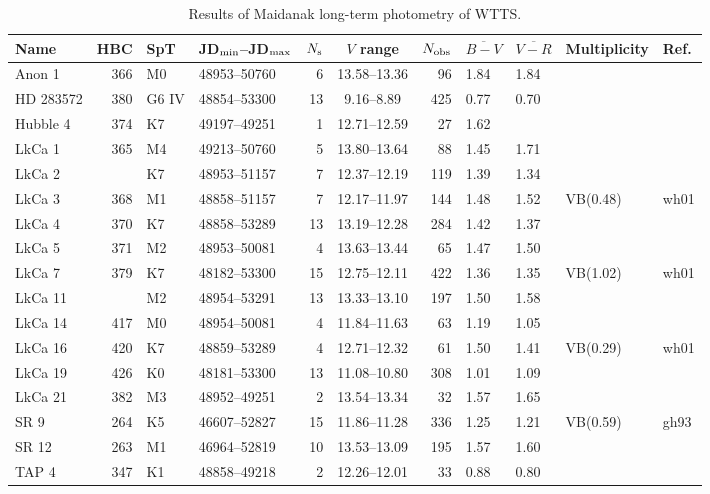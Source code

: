 \begin{table}%
\caption{Results of Maidanak long-term photometry of WTTS.}\label{tab1}
\small%
 {
\begin{tabular}{lrllrcrllll}
\hline \hline
Name      & HBC & SpT   &JD$_{\rm min}$--JD$_{\rm max}$ & $N_{\rm s}$ & $V$ range & $N_{\rm obs}$
& $\overline{B-V}$ & $\overline{V-R}$ & Multiplicity & Ref.\\
\hline
Anon 1    & 366 & M0    & 48953--50760 &  6 & 13.58--13.36 &  96 & 1.84 & 1.84 & & \\
HD 283572 & 380 & G6 IV & 48854--53300 & 13 &  9.16--8.89  & 425 & 0.77 & 0.70 & & \\
Hubble 4  & 374 & K7    & 49197--49251 &  1 & 12.71--12.59 &  27 & 1.62 & & &   \\
LkCa 1    & 365 & M4    & 49213--50760 &  5 & 13.80--13.64 &  88 & 1.45 & 1.71 & & \\
LkCa 2    &     & K7    & 48953--51157 &  7 & 12.37--12.19 & 119 & 1.39 & 1.34 & & \\
LkCa 3    & 368 & M1    & 48858--51157 &  7 & 12.17--11.97 & 144 & 1.48 & 1.52 & VB(0.48) & wh01 \\
LkCa 4    & 370 & K7    & 48858--53289 & 13 & 13.19--12.28 & 284 & 1.42 & 1.37 & & \\
LkCa 5    & 371 & M2    & 48953--50081 &  4 & 13.63--13.44 &  65 & 1.47 & 1.50 & & \\
LkCa 7    & 379 & K7    & 48182--53300 & 15 & 12.75--12.11 & 422 & 1.36 & 1.35 & VB(1.02) & wh01 \\
LkCa 11   &     & M2    & 48954--53291 & 13 & 13.33--13.10 & 197 & 1.50 & 1.58 & & \\
LkCa 14   & 417 & M0    & 48954--50081 &  4 & 11.84--11.63 &  63 & 1.19 & 1.05 & & \\
LkCa 16   & 420 & K7    & 48859--53289 &  4 & 12.71--12.32 &  61 & 1.50 & 1.41 & VB(0.29) & wh01 \\
LkCa 19   & 426 & K0    & 48181--53300 & 13 & 11.08--10.80 & 308 & 1.01 & 1.09 & & \\
LkCa 21   & 382 & M3    & 48952--49251 &  2 & 13.54--13.34 &  32 & 1.57 & 1.65 & & \\
SR 9      & 264 & K5    & 46607--52827 & 15 & 11.86--11.28 & 336 & 1.25 & 1.21 & VB(0.59) & gh93 \\
SR 12     & 263 & M1    & 46964--52819 & 10 & 13.53--13.09 & 195 & 1.57 & 1.60 & & \\
TAP 4     & 347 & K1    & 48858--49218 &  2 & 12.26--12.01 &  33 & 0.88 & 0.80 & & \\

\end{tabular}}
\end{table}
